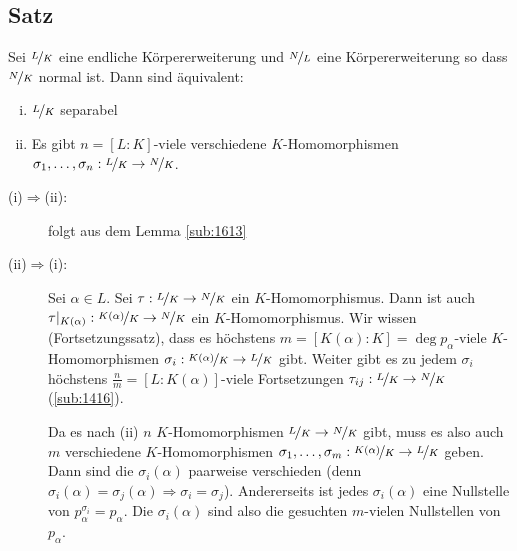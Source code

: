 \subsection[Satz: Charakterisierung von separabel über Anzahl der $K$-Homo. in normalem Oberkörper]{Satz} %
\label{sub:1612}
Sei $\nicefrac{L}{K}$ eine endliche Körpererweiterung und $\nicefrac{N}{L}$ eine Körpererweiterung so dass $\nicefrac{N}{K}$ normal ist. Dann sind äquivalent:
\begin{enumerate}[(i)]
	\item $\nicefrac{L}{K}$ separabel
	\item Es gibt $n= [L:K]$-viele verschiedene $K$-Homomorphismen $\sigma_1, \ldots , \sigma_n : \nicefrac{L}{K} \to \nicefrac{N}{K}$.
\end{enumerate}
\begin{description}
	\item[(i)$\Rightarrow $(ii):] folgt aus dem Lemma \ref{sub:1613}
	\item[(ii)$\Rightarrow $(i):] Sei $\alpha \in L$. Sei $\tau : \nicefrac{L}{K} \to \nicefrac{N}{K}$ ein $K$-Homomorphismus. Dann ist auch 
	$\tau|_{K(\alpha)} : \nicefrac{K(\alpha)}{K} \to \nicefrac{N}{K}$ ein $K$-Homomorphismus. Wir wissen (Fortsetzungssatz), dass es höchstens 
	$m=[K(\alpha):K] = \deg p_\alpha$-viele $K$-Homomorphismen $\sigma_i : \nicefrac{K(\alpha)}{K} \to \nicefrac{L}{K}$ gibt. Weiter gibt es zu jedem $\sigma_i$ höchstens 
	$\frac{n}{m}=[L:K(\alpha)] $-viele Fortsetzungen $\tau_{ij} : \nicefrac{L}{K} \to \nicefrac{N}{K}$ (\ref{sub:1416}). 
	
	Da es nach (ii) $n$ $K$-Homomorphismen
	$\nicefrac{L}{K} \to \nicefrac{N}{K}$ gibt, muss es also auch $m$ verschiedene $K$-Homomorphismen 
	$\sigma_1, \ldots , \sigma_m : \nicefrac{K(\alpha)}{K} \to \nicefrac{L}{K}$ geben. Dann sind die $\sigma_i(\alpha)$ paarweise verschieden (denn 
	$\sigma_i(\alpha) = \sigma_j(\alpha) \Rightarrow  \sigma_i = \sigma_j$). Andererseits ist jedes $\sigma_i(\alpha)$ eine Nullstelle von $p^{\sigma_i}_\alpha = p_\alpha$.
	Die $\sigma_i(\alpha)$ sind also die gesuchten $m$-vielen Nullstellen von $p_\alpha$. \bewende
\end{description}

